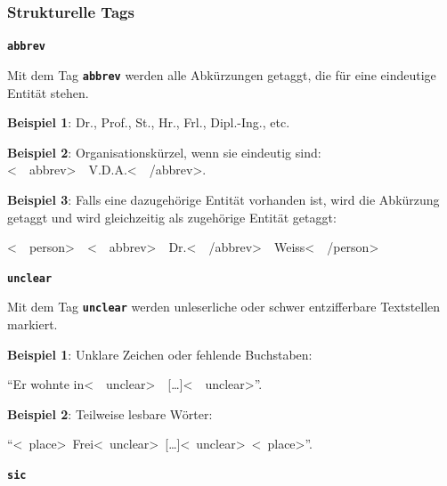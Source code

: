 \documentclass[12pt, a4paper, ngerman, bidi=default]{article}
\begin{document}
    \subsubsection{Strukturelle Tags}
    \begin{description}

    \item\texttt{\textbf{{\colorbox{abbrev}{abbrev}}}}
    
        
    Mit dem Tag \texttt{\texttt{\textbf{{\colorbox{abbrev}{abbrev}}}}} werden alle Abkürzungen getaggt, die für eine eindeutige Entität stehen.

    
    \noindent\textbf{ Beispiel 1}: Dr., Prof., St., Hr., Frl., Dipl.-Ing., etc.

    \textbf{ Beispiel 2}: Organisationskürzel, wenn sie eindeutig sind:\\\colorbox{VeryLightGray}{\textless\ \  abbrev\textgreater\ \  V.D.A.\textless\ \  /abbrev\textgreater}.

    \textbf{\textbf{ Beispiel 3}}: Falls eine dazugehörige Entität vorhanden ist, wird die Abkürzung getaggt und wird gleichzeitig als zugehörige Entität getaggt:

    \colorbox{VeryLightGray}{\textless\ \ person\textgreater\ \  \textless\ \  abbrev\textgreater\ \  Dr.\textless\ \  /abbrev\textgreater\ \  Weiss{\textless\ \  /person\textgreater}}
    
    \item\texttt{\textbf{{\colorbox{unclear}{unclear}}}}
    

    Mit dem Tag \texttt{\texttt{\textbf{{\colorbox{unclear}{unclear}}}}} werden unleserliche oder schwer entzifferbare Textstellen markiert.
    
    \noindent\textbf{ Beispiel 1}: Unklare Zeichen oder fehlende Buchstaben: 

    \colorbox{VeryLightGray}{\enquote{Er wohnte in\textless\ \ unclear\textgreater\ \ [\ldots]\textless\ \ unclear\textgreater}.}

    \textbf{ Beispiel 2}: Teilweise lesbare Wörter:

    \colorbox{VeryLightGray}{\enquote{{\textless~place\textgreater~Frei\textless~unclear\textgreater~[\ldots]\textless~unclear\textgreater~\textless~place\textgreater}}.}

    
    \item\texttt{\textbf{{\colorbox{sic}{sic}}}} 


\end{description}
\end{document}
